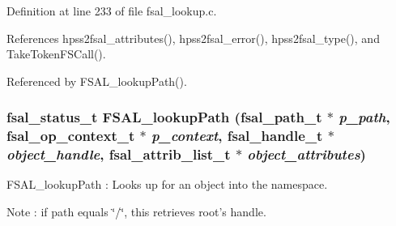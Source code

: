 Definition at line 233 of file fsal\_\-lookup.c.

References hpss2fsal\_\-attributes(), hpss2fsal\_\-error(), hpss2fsal\_\-type(), and TakeTokenFSCall().

Referenced by FSAL\_\-lookupPath().
\subsubsection[{FSAL\_\-lookupPath}]{\setlength{\rightskip}{0pt plus 5cm}fsal\_\-status\_\-t FSAL\_\-lookupPath (fsal\_\-path\_\-t $\ast$ {\em p\_\-path}, \/  fsal\_\-op\_\-context\_\-t $\ast$ {\em p\_\-context}, \/  fsal\_\-handle\_\-t $\ast$ {\em object\_\-handle}, \/  fsal\_\-attrib\_\-list\_\-t $\ast$ {\em object\_\-attributes})}\label{fsal__lookup_8c_b1e4dac2bd55519471bdf10957ff389f}


FSAL\_\-lookupPath : Looks up for an object into the namespace.

Note : if path equals \char`\"{}/\char`\"{}, this retrieves root's handle.

